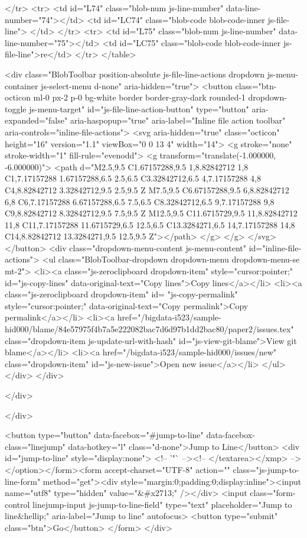       </tr>
      <tr>
        <td id="L74" class="blob-num js-line-number" data-line-number="74"></td>
        <td id="LC74" class="blob-code blob-code-inner js-file-line">
</td>
      </tr>
      <tr>
        <td id="L75" class="blob-num js-line-number" data-line-number="75"></td>
        <td id="LC75" class="blob-code blob-code-inner js-file-line">re</td>
      </tr>
</table>

  <div class="BlobToolbar position-absolute js-file-line-actions dropdown js-menu-container js-select-menu d-none" aria-hidden="true">
    <button class="btn-octicon ml-0 px-2 p-0 bg-white border border-gray-dark rounded-1 dropdown-toggle js-menu-target" id="js-file-line-action-button" type="button" aria-expanded="false" aria-haspopup="true" aria-label="Inline file action toolbar" aria-controls="inline-file-actions">
      <svg aria-hidden="true" class="octicon" height="16" version="1.1" viewBox="0 0 13 4" width="14">
        <g stroke="none" stroke-width="1" fill-rule="evenodd">
            <g transform="translate(-1.000000, -6.000000)">
                <path d="M2.5,9.5 C1.67157288,9.5 1,8.82842712 1,8 C1,7.17157288 1.67157288,6.5 2.5,6.5 C3.32842712,6.5 4,7.17157288 4,8 C4,8.82842712 3.32842712,9.5 2.5,9.5 Z M7.5,9.5 C6.67157288,9.5 6,8.82842712 6,8 C6,7.17157288 6.67157288,6.5 7.5,6.5 C8.32842712,6.5 9,7.17157288 9,8 C9,8.82842712 8.32842712,9.5 7.5,9.5 Z M12.5,9.5 C11.6715729,9.5 11,8.82842712 11,8 C11,7.17157288 11.6715729,6.5 12.5,6.5 C13.3284271,6.5 14,7.17157288 14,8 C14,8.82842712 13.3284271,9.5 12.5,9.5 Z"></path>
            </g>
        </g>
      </svg>
    </button>
    <div class="dropdown-menu-content js-menu-content" id="inline-file-actions">
      <ul class="BlobToolbar-dropdown dropdown-menu dropdown-menu-se mt-2">
        <li><a class="js-zeroclipboard dropdown-item" style="cursor:pointer;" id="js-copy-lines" data-original-text="Copy lines">Copy lines</a></li>
        <li><a class="js-zeroclipboard dropdown-item" id= "js-copy-permalink" style="cursor:pointer;" data-original-text="Copy permalink">Copy permalink</a></li>
        <li><a href="/bigdata-i523/sample-hid000/blame/84e57975f4b7a5e222082bac7d6d97b1dd2bac80/paper2/issues.tex" class="dropdown-item js-update-url-with-hash" id="js-view-git-blame">View git blame</a></li>
          <li><a href="/bigdata-i523/sample-hid000/issues/new" class="dropdown-item" id="js-new-issue">Open new issue</a></li>
      </ul>
    </div>
  </div>

  </div>

  </div>

  <button type="button" data-facebox="#jump-to-line" data-facebox-class="linejump" data-hotkey="l" class="d-none">Jump to Line</button>
  <div id="jump-to-line" style="display:none">
    <!-- '"` --><!-- </textarea></xmp> --></option></form><form accept-charset="UTF-8" action="" class="js-jump-to-line-form" method="get"><div style="margin:0;padding:0;display:inline"><input name="utf8" type="hidden" value="&#x2713;" /></div>
      <input class="form-control linejump-input js-jump-to-line-field" type="text" placeholder="Jump to line&hellip;" aria-label="Jump to line" autofocus>
      <button type="submit" class="btn">Go</button>
</form>  </div>

